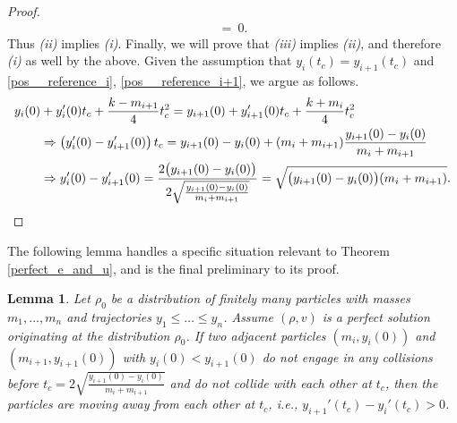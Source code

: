 \documentclass[11pt]{article}
\newtheorem{lemma}[theorem]{Lemma}
\numberwithin{equation}{section}
\begin{document}
\begin{proof}
\begin{align*}
                = \ 0.
            \end{align*}
            Thus \emph{(ii)} implies \emph{(i)}. Finally, we will prove that \emph{(iii)} implies \emph{(ii)}, and therefore \emph{(i)} as well by the above. Given the assumption that $y_i(t_c) = y_{i+1}(t_c)$ and \eqref{pos__reference_i}, \eqref{pos__reference_i+1}, we argue as follows.
            \begin{align*}
                y_i(0)& + y_i'(0)t_c + \frac{k - m_{i+1}}{4} t_c^2 = y_{i+1}(0) + y_{i+1}'(0) t_c + \frac{k + m_{i}}{4} t_c^2 
                \\ 
                &\Rightarrow \left (y_i'(0) - y_{i+1}'(0) \right) t_c = y_{i+1}(0) - y_i(0) + (m_i + m_{i+1}) \frac{y_{i+1}(0)-y_i(0)}{m_i+m_{i+1}} \\
                &\Rightarrow y_i'(0) - y_{i+1}'(0) = \frac{2\big(y_{i+1}(0) - y_i(0)\big)}{2\sqrt{\frac{y_{i+1}(0)-y_i(0)}{m_i+m_{i+1}}}} 
                =\sqrt{\big(y_{i+1}(0)-y_i(0)\big)(m_i+m_{i+1})}. \qedhere
            \end{align*}
        \end{proof}
        The following lemma handles a specific situation relevant to Theorem \ref{perfect_e_and_u}, and is the final preliminary to its proof.
        \begin{lemma}\label{Negative Relative Velocity}
            Let $\rho_0$ be a distribution of finitely many particles with masses $m_1,\ldots,m_n$ and trajectories $y_1\leq\ldots\leq y_n$. Assume $(\rho, v)$ is a perfect solution originating at the distribution $\rho_0$. If two adjacent particles $(m_i, y_i(0))$ and $(m_{i+1}, y_{i+1}(0))$ with $y_i(0) < y_{i+1}(0)$  do not engage in any collisions before \mbox{$t_c=2\sqrt{\frac{y_{i+1}(0)-y_i(0)}{m_i+m_{i+1}}}$} and do not collide with each other at $t_c$, then the particles are moving away from each other at $t_c$, i.e., $y_{i+1}'(t_c)-y_i'(t_c) > 0$.
        \end{lemma}
\end{document}
